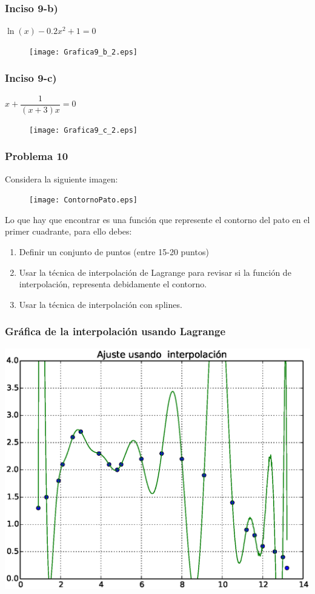 \begin{frame}
\frametitle{Inciso 9-b)}
$\ln(x) -0.2 x^{2} + 1 = 0$
\begin{figure}
	\centering
	\texttt{[image: Grafica9\_b\_2.eps]} 
\end{figure}
\end{frame}
\begin{frame}
\frametitle{Inciso 9-c)}
$x + \dfrac{1}{(x+3)x}= 0$
\begin{figure}
	\centering
	\texttt{[image: Grafica9\_c\_2.eps]} 
\end{figure}
\end{frame}
\begin{frame}
\frametitle{Problema 10}
Considera la siguiente imagen:
\begin{figure}[H]
	\centering
	\texttt{[image: ContornoPato.eps]}  
\end{figure}
\end{frame}
\begin{frame}
Lo que hay que encontrar es una función que represente el contorno del pato en el primer cuadrante, para ello debes:
\begin{enumerate}
\item Definir un conjunto de puntos (entre 15-20 puntos)
\item Usar la técnica de interpolación de Lagrange para revisar si la función de interpolación, representa debidamente el contorno.
\item Usar la técnica de interpolación con splines.
\end{enumerate}
\end{frame}
\begin{frame}
\frametitle{Gráfica de la interpolación usando Lagrange}
\includegraphics[scale=0.5]{Imagenes/Grafica10_01.eps} 
\end{frame}
